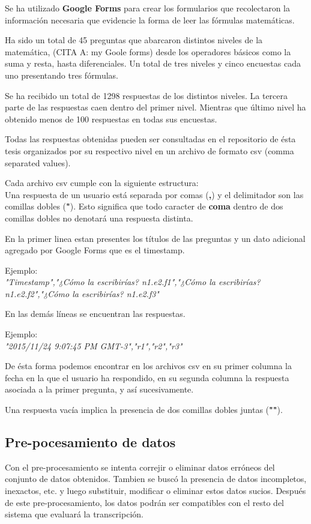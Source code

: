 Se ha utilizado \textbf{Google Forms} para crear los formularios que recolectaron la información necesaria que evidencie la forma de leer las fórmulas matemáticas.

Ha sido un total de 45 preguntas que abarcaron distintos niveles de la matemática, (CITA A: my Goole forms) desde los operadores básicos como la suma y resta, hasta diferenciales. Un total de tres niveles y cinco encuestas cada uno presentando tres fórmulas.

Se ha recibido un total de 1298 respuestas de los distintos niveles. La tercera parte de las respuestas caen dentro del primer nivel. Mientras que último nivel ha obtenido menos de 100 respuestas en todas sus encuestas.

Todas las respuestas obtenidas pueden ser consultadas en el repositorio de ésta tesis organizados por su respectivo nivel en un archivo de formato csv (comma separated values).

Cada archivo csv cumple con la siguiente estructura:\\
Una respuesta de un usuario está separada por comas (\textbf{,}) y el delimitador son las comillas dobles (\textbf{"}). Esto significa que todo caracter de \textbf{coma} dentro de dos comillas dobles no denotará una respuesta distinta.

En la primer linea estan presentes los títulos de las preguntas y un dato adicional agregado por Google Forms que es el timestamp.

Ejemplo:\\
\textit{"Timestamp","¿Cómo la escribirías? n1.e2.f1","¿Cómo la escribirías? n1.e2.f2","¿Cómo la escribirías? n1.e2.f3"}

En las demás líneas se encuentran las respuestas.

Ejemplo:\\
\textit{"2015/11/24 9:07:45 PM GMT-3","r1","r2","r3"}

De ésta forma podemos encontrar en los archivos csv en su primer columna la fecha en la que el usuario ha respondido, en su segunda columna la respuesta asociada a la primer pregunta, y así sucesivamente.

Una respuesta vacía implica la presencia de dos comillas dobles juntas (\textbf{""}).

\subsection{Pre-pocesamiento de datos}
Con el pre-procesamiento se intenta correjir o eliminar datos erróneos del conjunto de datos obtenidos. Tambien se buscó la presencia de datos incompletos, inexactos, etc. y luego substituir, modificar o eliminar estos datos sucios. Después de este pre-procesamiento, los datos podrán ser compatibles con el resto del sistema que evaluará la transcripción.

